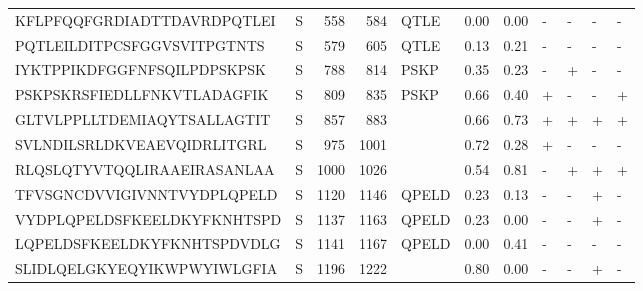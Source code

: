 \begin{tabular}{llrrlrrllll}
KFLPFQQFGRDIADTTDAVRDPQTLEI &       S &    558 &   584 &               QTLE &            0.00 &             0.00 &      - &       - &      - &       - \\
PQTLEILDITPCSFGGVSVITPGTNTS &       S &    579 &   605 &               QTLE &            0.13 &             0.21 &      - &       - &      - &       - \\
IYKTPPIKDFGGFNFSQILPDPSKPSK &       S &    788 &   814 &               PSKP &            0.35 &             0.23 &      - &       + &      - &       - \\
PSKPSKRSFIEDLLFNKVTLADAGFIK &       S &    809 &   835 &               PSKP &            0.66 &             0.40 &      + &       - &      - &       + \\
GLTVLPPLLTDEMIAQYTSALLAGTIT &       S &    857 &   883 &                    &            0.66 &             0.73 &      + &       + &      + &       + \\
SVLNDILSRLDKVEAEVQIDRLITGRL &       S &    975 &  1001 &                    &            0.72 &             0.28 &      + &       - &      - &       - \\
RLQSLQTYVTQQLIRAAEIRASANLAA &       S &   1000 &  1026 &                    &            0.54 &             0.81 &      - &       + &      + &       + \\
TFVSGNCDVVIGIVNNTVYDPLQPELD &       S &   1120 &  1146 &              QPELD &            0.23 &             0.13 &      - &       - &      + &       - \\
VYDPLQPELDSFKEELDKYFKNHTSPD &       S &   1137 &  1163 &              QPELD &            0.23 &             0.00 &      - &       - &      + &       - \\
LQPELDSFKEELDKYFKNHTSPDVDLG &       S &   1141 &  1167 &              QPELD &            0.00 &             0.41 &      - &       - &      - &       - \\
SLIDLQELGKYEQYIKWPWYIWLGFIA &       S &   1196 &  1222 &                    &            0.80 &             0.00 &      - &       - &      + &       - \\
\bottomrule
\end{tabular}
